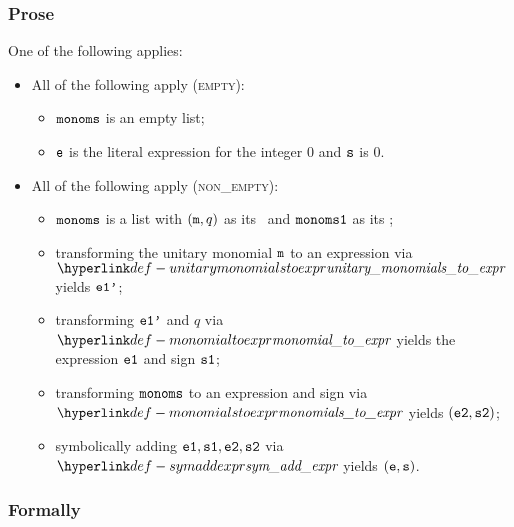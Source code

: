 \subsubsection{Prose}
One of the following applies:
\begin{itemize}
  \item All of the following apply (\textsc{empty}):
  \begin{itemize}
    \item $\texttt{monoms}$ is an empty list;
    \item $\texttt{e}$ is the literal expression for the integer $0$ and $\texttt{s}$ is $0$.
  \end{itemize}

  \item All of the following apply (\textsc{non\_empty}):
  \begin{itemize}
    \item $\texttt{monoms}$ is a list with $(\texttt{m},q)$ as its \head\ and $\texttt{monoms1}$ as its \tail;
    \item transforming the unitary monomial $\texttt{m}$ to an expression via \\ $\unitarymonomialstoexpr$ yields $\texttt{e1'}$;
    \item transforming $\texttt{e1'}$ and $q$ via $\monomialtoexpr$ yields the expression $\texttt{e1}$ and sign $\texttt{s1}$;
    \item transforming $\texttt{monoms}$ to an expression and sign via $\monomialstoexpr$ yields $(\texttt{e2}, \texttt{s2})$;
    \item symbolically adding $\texttt{e1}, \texttt{s1}, \texttt{e2}, \texttt{s2}$ via $\symaddexpr$ yields $(\texttt{e}, \texttt{s})$.
  \end{itemize}
\end{itemize}

\subsubsection{Formally}

